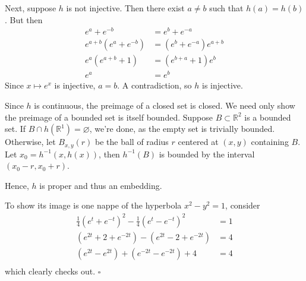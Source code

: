 \documentclass{article}
\begin{document}
Next, suppose $h$ is not injective. Then there exist $a\ne b$
such that $h(a)=h(b)$. But then
\begin{align*}
	e^a+e^{-b} &= e^b+e^{-a}\\
	e^{a+b}(e^a+e^{-b}) &= (e^b+e^{-a})e^{a+b}\\
	e^a(e^{a+b}+1) &= (e^{b+a}+1)e^b\\
	e^a &= e^b
\end{align*}
Since $x\mapsto e^x$ is injective, $a=b$. A contradiction, so
$h$ is injective.

Since $h$ is continuous, the preimage of a closed set is closed.
We need only show the preimage of a bounded set is itself bounded.
Suppose $B\subset\mathbb{R}^2$ is a bounded set. If
$B\cap h(\mathbb{R}^1)=\varnothing$, we're done, as the empty set
is trivially bounded.
Otherwise, let $B_{x,y}(r)$ be the ball of radius $r$ centered at
$(x,y)$ containing $B$. Let $x_0 = h^{-1}(x, h(x))$, then
$h^{-1}(B)$ is bounded by the interval $(x_0-r,x_0+r)$.

Hence, $h$ is proper and thus an embedding.

To show its image is one nappe of the hyperbola $x^2-y^2=1$, consider
\begin{align*}
	\frac{1}{4}(e^t+e^{-t})^2-\frac{1}{4}(e^t-e^{-t})^2 &= 1\\
	(e^{2t}+2+e^{-2t})-(e^{2t}-2+e^{-2t}) &= 4\\
	(e^{2t}-e^{2t})+(e^{-2t}-e^{-2t})+4 &= 4\\
\end{align*}
which clearly checks out.
\hfill $\square$
\end{document}
